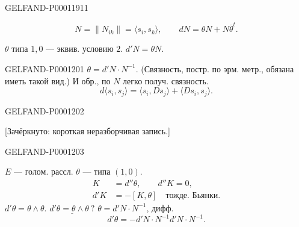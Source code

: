 \begin{GelfandAdjacentEvidence}{GELFAND-P000119}{11}

\begin{equation*}
N=\|N_{ik}\|=\langle s_i,s_k\rangle,\qquad
dN=\theta N+N\overline\theta^t.
\end{equation*}

$\theta$ типа $1,0$ — эквив. условию $2$.
$d'N=\theta N$.
\end{GelfandAdjacentEvidence}




\begin{GelfandAdjacentEvidence}{GELFAND-P000120}{1}
$\theta=d'N\cdot N^{-1}$.
(Связность, постр. по эрм. метр., обязана иметь такой вид.)
И обр., по $N$ легко получ. связность.
\begin{equation*}d\langle s_i,s_j\rangle=\langle s_i,Ds_j\rangle+\langle Ds_i,s_j\rangle.\end{equation*}
\noindent\underline{}
\end{GelfandAdjacentEvidence}
\begin{GelfandAdjacentEvidence}{GELFAND-P000120}{2}

[Зачёркнуто: короткая неразборчивая запись.]
\end{GelfandAdjacentEvidence}
\begin{GelfandAdjacentEvidence}{GELFAND-P000120}{3}

$E$ — голом. рассл. $\theta$ — типа $(1,0)$.
\begin{align*}
K&=d''\theta,\qquad d''K=0,\\
d'K&=-[K,\theta]\quad\text{тожде. Бьянки.}
\end{align*}
$d'\theta=\theta\wedge\theta$.
$\underline{d'\theta=\theta\wedge\theta\ ?}$
$\theta=d'N\cdot N^{-1}$, дифф.
\begin{equation*}d'\theta=-d'N\cdot N^{-1}d'N\cdot N^{-1}.\end{equation*}
\end{GelfandAdjacentEvidence}
